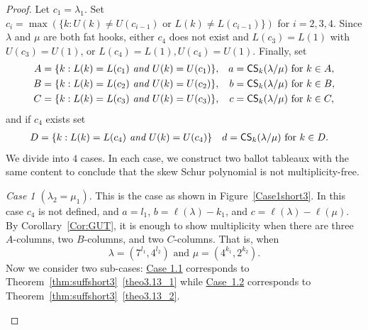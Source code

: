 \documentclass[ALCO,ThmDefs,Unicode,epreuves]{cedram}
\newcommand{\CS	}{\mathsf{CS}}
\let\hypertargeta\hypertarget %
\let\hyperlinka\hyperlink %
\newenvironment{Case}[1]{\par\vskip2pt\noindent%
\emph{#1}.}{\vskip2pt}
\begin{document}
\begin{proof}
Let $c_1 = \lambda_1$. Set $c_i = \max(\{k : U(k) \neq U(c_{i-1})\text{ or }L(k) \neq L(c_{i-1})\})$ for $i=2,3,4$. Since $\lambda$ and $\mu$ are both fat hooks, either $c_4$ does not exist and $L(c_3)=L(1)$ with $U(c_3)=U(1)$, or $L(c_4)=L(1),U(c_4)=U(1)$. Finally, set
\begin{align*}
A & = \{ k : L(k) = L(c_1)\emph{ and }U(k) = U(c_1) \}, & a & = \CS _k(\lambda / \mu)\text{ for }k \in A, \\
B & = \{ k : L(k) = L(c_2)\emph{ and }U(k) = U(c_2) \}, & b & = \CS _k(\lambda / \mu)\text{ for }k \in B, \\
C & = \{ k : L(k) = L(c_3)\emph{ and }U(k) = U(c_3) \}, & c & = \CS _k(\lambda / \mu)\text{ for }k \in C,
\end{align*}
and if $c_4$ exists set
\begin{align*}
D & = \{ k : L(k) = L(c_4)\emph{ and }U(k) = U(c_4) \} & d & = \CS _k(\lambda / \mu)\text{ for }k \in D.
\end{align*}
We divide into $4$ cases. In each case, we construct two ballot tableaux with the same content to conclude that the skew Schur polynomial is not multiplicity-free.

\begin{Case}
{\hypertargeta{theo3.13_case1}{Case 1} $(\lambda_2 = \mu_1)$} This is the case as shown in Figure~\ref{Case1short3}. In this case $c_4$ is not defined, and $a = l_1$, $b = \ell(\lambda)-k_1$, and $c = \ell(\lambda)-\ell(\mu)$. By Corollary~\ref{Cor:GUT}, it is enough to show multiplicity when there are three $A$-columns, two $B$-columns, and two $C$-columns. That is, when 
\[
\lambda = (7^{l_1}, 4^{l_2})\text{ and }\mu=(4^{k_1},2^{k_2}).
\] 
Now we consider two sub-cases: \hyperlinka{theo3.13_case1.1}{Case 1.1} corresponds to Theorem~\ref{thm:suffshort3}~\ref{theo3.13_1} while \hyperlinka{theo3.13_case1.2}{Case~1.2} corresponds to Theorem~\ref{thm:suffshort3}~\ref{theo3.13_2}.

\begin{figure}[htb]\centering
\end{figure}
\end{Case}
\end{proof}
\end{document}
